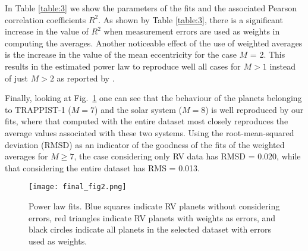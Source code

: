\documentclass[letter]{aa} %
\begin{document}
        In Table \ref{table:3} we show the parameters of the fits and the associated Pearson correlation coefficients $R^2$. As shown by Table \ref{table:3}, there is a significant increase in the value of $R^2$ when measurement errors are used as weights in computing the averages. Another noticeable effect of the use of weighted averages is the increase in the value of the mean eccentricity for the case $M$ = 2. This results in the estimated power law to reproduce well all cases for $M>1$ instead of just $M>2$ as reported by \cite{limbach}.
        
        Finally, looking at Fig.~\ref{Fig2} one can see that the behaviour of the planets belonging to TRAPPIST-1 ($M=7$) and the solar system ($M=8$) is well reproduced by our fits, where that computed with the entire dataset most closely reproduces the average values associated with these two systems. Using the root-mean-squared deviation (RMSD) as an indicator of the goodness of the fits of the weighted averages for $M\geq7$, the case considering only RV data has RMSD = 0.020, while that considering the entire dataset has RMS = 0.013.%

        
        
        \begin{figure}
                \centering
                \texttt{[image: final\_fig2.png]}
                \caption{Power law fits. Blue squares indicate RV planets without considering errors, red triangles indicate RV planets with weights as errors, and black circles indicate all planets in the selected dataset with errors used as weights.
                }
                \label{Fig2}
        \end{figure}
\end{document}
